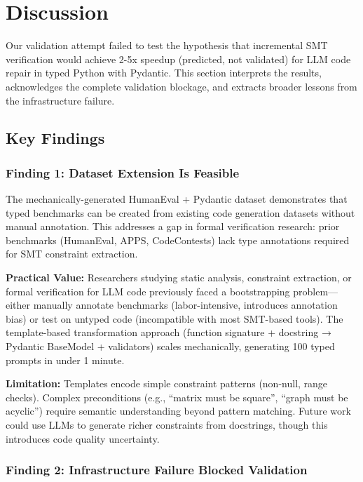 \section{Discussion}

Our validation attempt failed to test the hypothesis that incremental SMT verification would achieve 2-5x speedup (predicted, not validated) for LLM code repair in typed Python with Pydantic. This section interprets the results, acknowledges the complete validation blockage, and extracts broader lessons from the infrastructure failure.

\subsection{Key Findings}

\subsubsection{Finding 1: Dataset Extension Is Feasible}

The mechanically-generated HumanEval + Pydantic dataset demonstrates that typed benchmarks can be created from existing code generation datasets without manual annotation. This addresses a gap in formal verification research: prior benchmarks (HumanEval, APPS, CodeContests) lack type annotations required for SMT constraint extraction.

\textbf{Practical Value:} Researchers studying static analysis, constraint extraction, or formal verification for LLM code previously faced a bootstrapping problem---either manually annotate benchmarks (labor-intensive, introduces annotation bias) or test on untyped code (incompatible with most SMT-based tools). The template-based transformation approach (function signature + docstring → Pydantic BaseModel + validators) scales mechanically, generating 100 typed prompts in under 1 minute.

\textbf{Limitation:} Templates encode simple constraint patterns (non-null, range checks). Complex preconditions (e.g., ``matrix must be square'', ``graph must be acyclic'') require semantic understanding beyond pattern matching. Future work could use LLMs to generate richer constraints from docstrings, though this introduces code quality uncertainty.

\subsubsection{Finding 2: Infrastructure Failure Blocked Validation}

